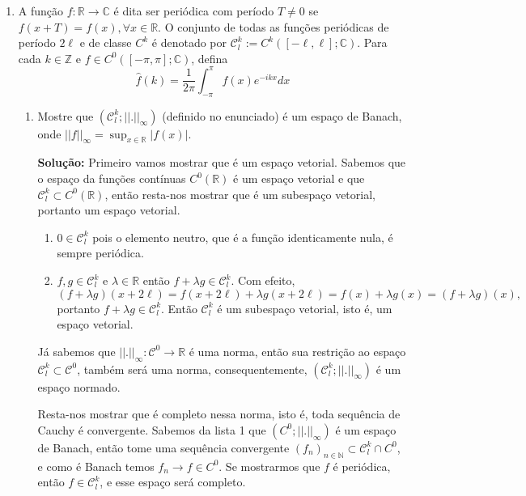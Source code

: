 \documentclass{article}
\begin{document}
\begin{enumerate}
\begin{enumerate}
				
				
				
		\end{enumerate}
		
		
		\item A função $f:\mathbb{R} \to \mathbb{C}$ é dita ser periódica com período $T \neq 0$ se $f(x+T) = f(x), \forall x \in \mathbb{R} $. O conjunto de todas as funções periódicas de período $2\ell$ e de classe $C^{k}$ é denotado por $\mathcal{C}^{k}_{l}:=C^{k}([-\ell, \ell]; \mathbb{C})$. Para cada $k \in \mathbb{Z}$ e $f \in C^{0}([-\pi, \pi]; \mathbb{C})$, defina
		$$
		\hat{f}(k) = \frac{1}{2\pi}\int_{-\pi}^{\pi} f(x)e^{-ikx}dx
		$$
		
		\begin{enumerate}
			\item Mostre que $(\mathcal{C}^{k}_{l}; ||.||_{\infty})$ (definido no enunciado) é um espaço de Banach, onde $||f||_{\infty} = \sup_{x \in \mathbb{R}}|f(x)|$.
			
			\textbf{Solução:} Primeiro vamos mostrar que é um espaço vetorial. Sabemos que o espaço da funções contínuas $C^{0}(\mathbb{R})$ é um espaço vetorial e que $\mathcal{C}^{k}_{l} \subset C^{0}(\mathbb{R})$, então resta-nos mostrar que é um subespaço vetorial, portanto um espaço vetorial.
			
			\begin{enumerate}
				\item $0 \in \mathcal{C}^{k}_{l}$ pois o elemento neutro, que é a função identicamente nula, é sempre periódica.
				
				\item $f, g \in \mathcal{C}^{k}_{l}$ e $\lambda \in \mathbb{R}$ então $f+\lambda g \in \mathcal{C}^{k}_{l}$. Com efeito, 
				$$
				(f+\lambda g)(x+2\ell) = f(x+2\ell)+\lambda g(x+2\ell) = f(x)+\lambda g(x)=(f+\lambda g)(x),
				$$
 				portanto $f+\lambda g \in  \mathcal{C}^{k}_{l}$. Então $\mathcal{C}^{k}_{l}$ é um subespaço vetorial, isto é, um espaço vetorial. 
				
			\end{enumerate}
			 
			Já sabemos que $||.||_{\infty}:\mathcal{C}^{0} \to \mathbb{R}$ é uma norma, então sua restrição ao espaço $\mathcal{C}^{k}_{l} \subset \mathcal{C}^{0}$, também será uma norma, consequentemente, $(\mathcal{C}^{k}_{l}; ||.||_{\infty})$ é um espaço normado.
			
			Resta-nos mostrar que é completo nessa norma, isto é, toda sequência de Cauchy é convergente. Sabemos da lista 1 que $(C^{0}; ||.||_{\infty})$ é um espaço de Banach, então tome uma sequência convergente $(f_{n})_{n \in \mathbb{N}} \subset \mathcal{C}^{k}_{l} \cap C^{0}$, e como é Banach temos $f_{n} \to f \in C^{0}$. Se mostrarmos que $f$ é periódica, então $f \in \mathcal{C}^{k}_{l}$, e esse espaço será completo.
			

\end{enumerate}
\end{enumerate}
\end{document}
